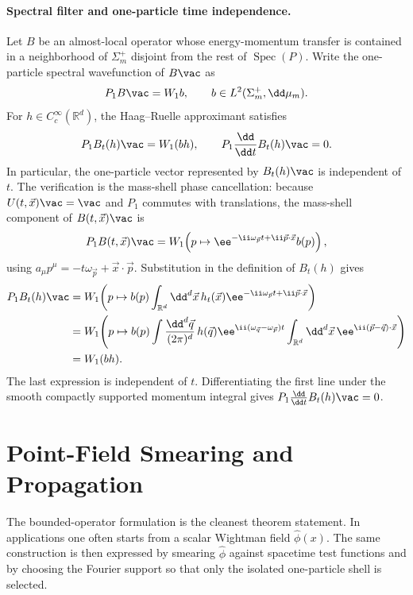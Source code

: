 \paragraph{Spectral filter and one-particle time independence.}
Let \(B\) be an almost-local operator whose energy-momentum transfer is
contained in a neighborhood of \(\Sigma_m^+\) disjoint from the rest of
\(\operatorname{Spec}(P)\).  Write the one-particle spectral wavefunction of
\(B\vac\) as
\[
  P_1B\vac
  =
  W_1 b,\qquad
  b\in L^2(\Sigma_m^+,\dd\mu_m).
\]
For \(h\in C_c^\infty(\mathbb R^d)\), the Haag--Ruelle approximant satisfies
\[
  P_1B_t(h)\vac
  =
  W_1(bh),
  \qquad
  P_1\frac{\dd}{\dd t}B_t(h)\vac=0.
\]
In particular, the one-particle vector represented by \(B_t(h)\vac\) is
independent of \(t\).
The verification is the mass-shell phase cancellation: because
\(U(t,\vec x)\vac=\vac\) and \(P_1\) commutes with translations,
the mass-shell component of \(B(t,\vec x)\vac\) is
\[
  P_1B(t,\vec x)\vac
  =
  W_1\!\left(
    p\mapsto
    \ee^{-\ii\omega_{\vec p}t+\ii\vec p\cdot\vec x}b(p)
  \right),
\]
using \(a_\mu p^\mu=-t\omega_{\vec p}+\vec x\cdot\vec p\).  Substitution in
the definition of \(B_t(h)\) gives
\[
\begin{aligned}
P_1B_t(h)\vac
&=
W_1\!\left(
  p\mapsto b(p)
  \int_{\mathbb R^d}\dd^d\vec x\,
  h_t(\vec x)
  \ee^{-\ii\omega_{\vec p}t+\ii\vec p\cdot\vec x}
\right)  \\
&=
W_1\!\left(
  p\mapsto b(p)
  \int\frac{\dd^d\vec q}{(2\pi)^d}\,h(\vec q)
  \ee^{\ii(\omega_{\vec q}-\omega_{\vec p})t}
  \int_{\mathbb R^d}\dd^d\vec x\,
  \ee^{\ii(\vec p-\vec q)\cdot\vec x}
\right)  \\
&=W_1(bh).
\end{aligned}
\]
The last expression is independent of \(t\).  Differentiating the first line
under the smooth compactly supported momentum integral gives
\(P_1\frac{\dd}{\dd t}B_t(h)\vac=0\).

\section{Point-Field Smearing and Propagation}

The bounded-operator formulation is the cleanest theorem statement.  In
applications one often starts from a scalar Wightman field \(\hat\phi(x)\).  The
same construction is then expressed by smearing \(\hat\phi\) against spacetime
test functions and by choosing the Fourier support so that only the isolated
one-particle shell is selected.

